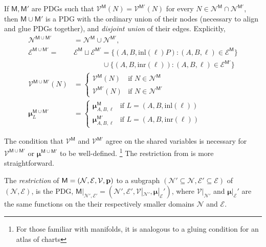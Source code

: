 \documentclass{article}
\newcommand{\notation}[2][]{#1}
\renewcommand{\notation}[2][]{{\color{notationcolor} #2}}
\newcommand{\vfullfootnote}[1]{}
\renewcommand{\vfullfootnote}[1]{\footnote{#1}}
\newcommand{\bmu}{\boldsymbol{\mu}}
\newcommand{\V}{\mathcal V}
\newcommand{\N}{\mathcal N}
\newcommand{\Ed}{\mathcal E}
\newcommand{\sfM}{\mathsf M}
\newcommand{\MN}{PDG}
\numberwithin{equation}{section}
\begin{document}
	\begin{defn}[union] \label{def:model-union}
		If $\sfM, \sfM'$ are \MN s such that $\V^\sfM(N) = \V^{\sfM'}(N)$ for every $N \in  \N^{\sfM} \cap \N^{\sfM'}$, then $\sfM \cup \sfM'$ is a PDG with the ordinary union of their nodes (necessary to align and glue PDGs together), and \emph{disjoint union} of their edges. \notation{Explicitly,
		\begin{align*}
			\N^{\sfM \cup \sfM'} &= \N^\sfM \cup \N^{\sfM'},  \\
			\Ed^{\sfM \cup \sfM'} \!=& \Ed^\sfM \sqcup \Ed^{\sfM'}\!
				=  \{ (A, B, \text{inl}(\ell)P) : (A,B,\ell)\in \Ed^\sfM \}  \\
					&\qquad\qquad \cup \{ (A, B, \text{inr}(\ell)) : (A,B,\ell)\in \Ed^{\sfM'} \} \\ 
			\V^{\sfM \cup \sfM'} (N) &= \begin{cases}
					\V^{\sfM}(N) & \text{if }N \in \N^\sfM \\
					\V^{\sfM'}(N) &\text{if }N \in \N^{\sfM'} 
				\end{cases}\\
			\bmu^{\sfM \cup \sfM'}_L &= \begin{cases}
				\bmu^{\sfM}_{A, B, \ell} &\text{if } L = (A, B, \text{inl} (\ell)) \\
				\bmu^{\sfM'}_{A, B, \ell} &\text{if } L = (A, B, \text{inr} (\ell)) 
			\end{cases}
		\end{align*}}
	\end{defn}
	The condition that $\V^\sfM$ and $\V^{\sfM'}$ agree on the shared variables is necessary for $\V^{\sfM\cup \sfM'}$ or $\bmu^{\sfM \cup \sfM'}$ to be well-defined.%
		\vfullfootnote{For those familiar with manifolds, it is analogous to a gluing condition for an atlas of charts}
	The restriction from  is more straightforward.%
	
	\begin{defn}[restriction]\label{def:restriction}
		The \emph{restriction} of $\sfM = \mnvars[]$ to a subgraph $(\N' \subseteq \N, \Ed' \subseteq \Ed)$ of $(\N, \Ed)$, is the PDG, $\sfM|_{\N', \Ed'} = (\N', \Ed', \V |_{\N'}, \bmu|_\Ed')$, where 
		$\V|_{\N'}$ and $\bmu|_\Ed'$ are the same functions on the their respectively smaller domains $\N$ and $\Ed$. 
	\end{defn}
	
\end{document}
